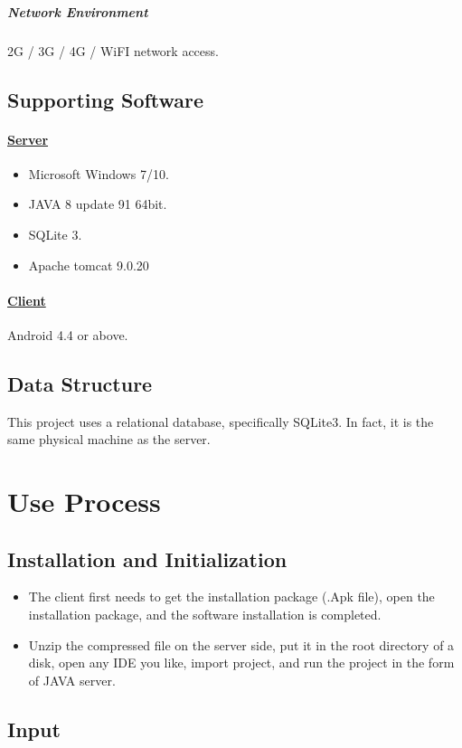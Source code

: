 \documentclass[10pt]{article}
\begin{document}
\subparagraph{Network Environment}
2G / 3G / 4G / WiFI network access.

\subsection{Supporting Software}
\paragraph{\underline{Server}}
\begin{itemize}
	\item Microsoft Windows 7/10.
	\item JAVA 8 update 91 64bit.
	\item SQLite 3.
	\item Apache tomcat 9.0.20
\end{itemize}

\paragraph{\underline{Client}}
Android 4.4 or above.

\subsection{Data Structure}
This project uses a relational database, specifically SQLite3. In fact, it is the same physical machine as the server.

\section{Use Process}
\subsection{Installation and Initialization}
\begin{itemize}
	\item The client first needs to get the installation package (.Apk file), open the installation package, and the software installation is completed.
	\item Unzip the compressed file on the server side, put it in the root directory of a disk, open any IDE you like, import project, and run the project in the form of JAVA server.
\end{itemize}

\subsection{Input}
\end{document}
